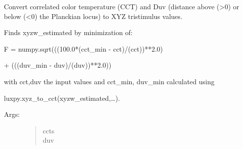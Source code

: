 \documentclass[letterpaper,10pt,english]{sphinxmanual}
\begin{document}
\begin{fulllineitems}
\label{\detokenize{color:luxpy.color.cct.cct_to_xyz}}
Convert correlated color temperature (CCT) and Duv (distance above (\textgreater{}0) or 
below (\textless{}0) the Planckian locus) to XYZ tristimulus values.

\begin{DUlineblock}{0em}
\item[] Finds xyzw\_estimated by minimization of:
\item[] 
\item[]
\begin{DUlineblock}{\DUlineblockindent}
\item[] F = numpy.sqrt(((100.0*(cct\_min - cct)/(cct))**2.0) 
\item[]
\begin{DUlineblock}{\DUlineblockindent}
\item[] + (((duv\_min - duv)/(duv))**2.0))
\item[] 
\end{DUlineblock}
\end{DUlineblock}
\item[] with cct,duv the input values and cct\_min, duv\_min calculated using 
\item[] luxpy.xyz\_to\_cct(xyzw\_estimated,…).
\end{DUlineblock}
\begin{description}
\item[{Args:}] \leavevmode\begin{quote}\begin{description}
\item[{ccts}] \leavevmode
{}

\item[{duv}] \leavevmode
{}


\end{description}
\end{quote}
\end{description}
\end{fulllineitems}
\end{document}
